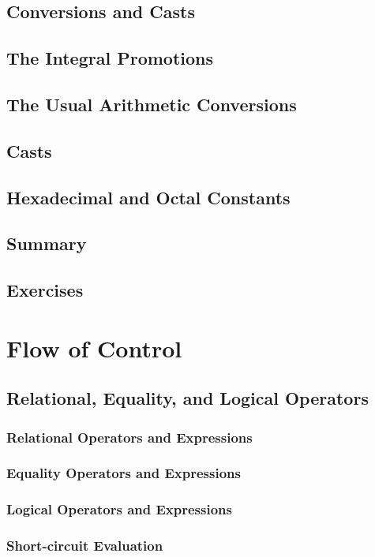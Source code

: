 \documentclass[12pt]{book}
\begin{document}
\section{Conversions and Casts}
\section{The Integral Promotions}
\section{The Usual Arithmetic Conversions}
\section{Casts}
\section{Hexadecimal and Octal Constants}
\section{Summary}
\section{Exercises}

\chapter{Flow of Control}

\section{Relational, Equality, and Logical Operators}
\subsection{Relational Operators and Expressions}
\subsection{Equality Operators and Expressions}
\subsection{Logical Operators and Expressions}
\subsection{Short-circuit Evaluation}
\end{document}
